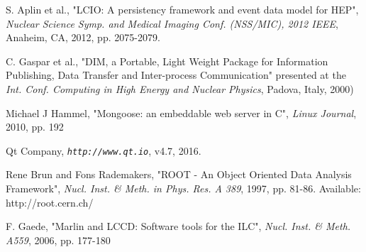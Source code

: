 \documentclass[conference]{IEEEtran}
\begin{document}
\begin{thebibliography}{1}

S. Aplin et al., "LCIO: A persistency framework and event data model for HEP", \emph{Nuclear Science Symp. and Medical Imaging Conf. (NSS/MIC), 2012 IEEE}, Anaheim, CA, 2012, pp. 2075-2079.

C. Gaspar et al., "DIM, a Portable, Light Weight Package for Information Publishing, Data Transfer and Inter-process Communication" presented at the \emph{Int. Conf. Computing in High Energy and Nuclear Physics}, Padova, Italy, 2000)

Michael J Hammel, "Mongoose: an embeddable web server in C", \emph{Linux Journal}, 2010, pp. 192

Qt Company, \emph{\tt http://www.qt.io}, v4.7, 2016.

Rene Brun and Fons Rademakers, "ROOT - An Object Oriented Data Analysis Framework", \emph{Nucl. Inst. \& Meth. in Phys. Res. A 389}, 1997, pp. 81-86. Available: http://root.cern.ch/

F. Gaede,  "Marlin and LCCD: Software tools for the ILC", \emph{Nucl. Inst. \& Meth. A559}, 2006, pp. 177-180

\end{thebibliography}


%










\end{document}
